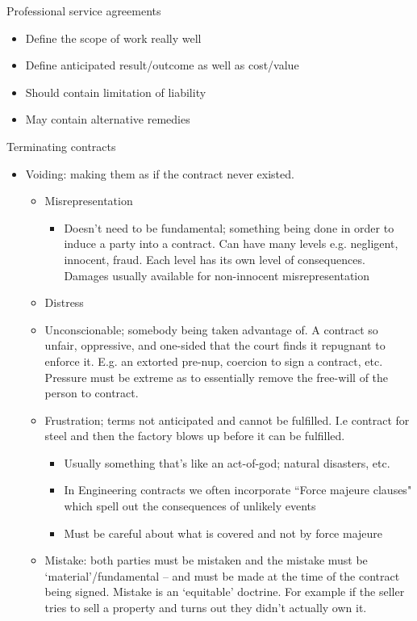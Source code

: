 \documentclass[10pt]{article}
\begin{document}
Professional service agreements
\begin{itemize}
	\item Define the scope of work really well
	\item Define anticipated result/outcome as well as cost/value
	\item Should contain limitation of liability
	\item May contain alternative remedies
\end{itemize}

Terminating contracts
\begin{itemize}
	\item Voiding: making them as if the contract never existed. 
		\begin{itemize}
			\item Misrepresentation
				\begin{itemize}
					\item Doesn't need to be fundamental; something being done in order to induce a party into a contract. Can have many levels e.g. negligent, innocent, fraud. Each level has its own level of consequences. Damages usually available for non-innocent misrepresentation 
				\end{itemize}
			\item Distress
			\item Unconscionable; somebody being taken advantage of. A contract so unfair, oppressive, and one-sided that the court finds it repugnant to enforce it. E.g. an extorted pre-nup, coercion to sign a contract, etc. Pressure must be extreme as to essentially remove the free-will of the person to contract.
			\item Frustration; terms not anticipated and cannot be fulfilled. I.e contract for steel and then the factory blows up before it can be fulfilled.
				\begin{itemize}
					\item  Usually something that's like an act-of-god; natural disasters, etc.
					\item In Engineering contracts we often incorporate ``Force majeure clauses" which spell out the consequences of unlikely events
					\item Must be careful about what is covered and not by force majeure
				\end{itemize}
			\item Mistake: both parties must be mistaken and the mistake must be `material'/fundamental -- and must be made at the time of the contract being signed. Mistake is an `equitable' doctrine.  For example if the seller tries to sell a property and turns out they didn't actually own it.

\end{itemize}
\end{itemize}
\end{document}
